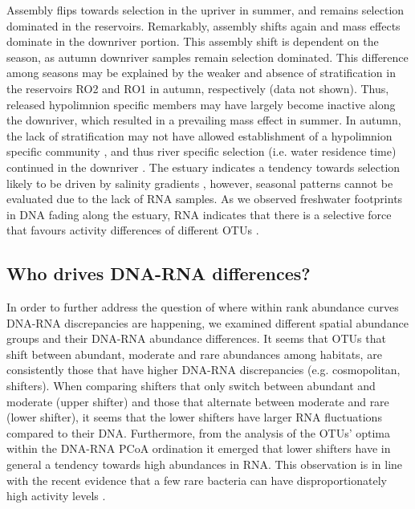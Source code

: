 \documentclass[12pt,a4paper]{article} %
\begin{document}
Assembly flips towards selection in the upriver in summer, and remains selection dominated in the reservoirs. Remarkably, assembly shifts again and mass effects dominate in the downriver portion. This assembly shift is dependent on the season, as autumn downriver samples remain selection dominated. This difference among seasons may be explained by the weaker and absence of stratification in the reservoirs RO2 and RO1 in autumn, respectively (data not shown). Thus, released hypolimnion specific members \citep{Ruiz-Gonzalez2013, Ruiz-Gonzalez2015a} may have largely become inactive along the downriver, which resulted in a prevailing mass effect in summer. In autumn, the lack of stratification may not have allowed establishment of a hypolimnion specific community \citep{Yu2014}, and thus river specific selection (i.e. water residence time) continued in the downriver \citep{Read2015}. The estuary indicates a tendency towards selection likely to be driven by salinity gradients \citep{Bouvier2002, Crump2004}, however, seasonal patterns cannot be evaluated due to the lack of RNA samples. As we observed freshwater footprints in DNA fading along the estuary, RNA indicates that there is a selective force that favours activity differences of different OTUs \citep{Campbell2013}.

\subsection*{Who drives DNA-RNA differences?}
In order to further address the question of where within rank abundance curves DNA-RNA discrepancies are happening, we examined different spatial abundance groups and their DNA-RNA abundance differences. It seems that OTUs that shift between abundant, moderate and rare abundances among habitats, are consistently those that have higher DNA-RNA discrepancies (e.g. cosmopolitan, shifters). When comparing shifters that only switch between abundant and moderate (upper shifter) and those that alternate between moderate and rare (lower shifter), it seems that the lower shifters have larger RNA fluctuations compared to their DNA. Furthermore, from the analysis of the OTUs' optima within the DNA-RNA PCoA ordination it emerged that lower shifters have in general a tendency towards high abundances in RNA. This observation is in line with the recent evidence that a few rare bacteria can have disproportionately high activity levels \citep{Campbell2013, Campbell2011}.
\end{document}
